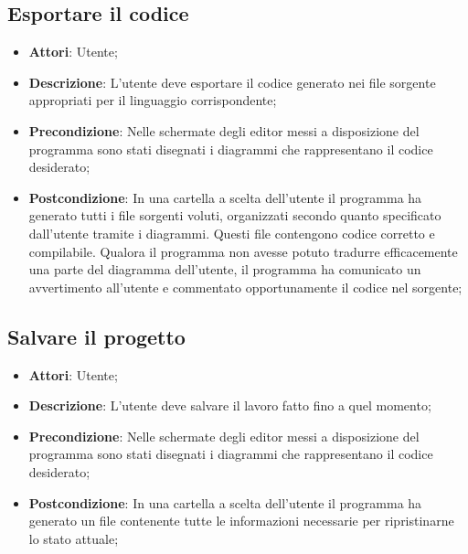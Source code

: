 \documentclass[../AnalisiDeiRequisiti.tex]{subfiles}
\begin{document}
	\subsection{Esportare il codice}
	\begin{itemize}
		\item \textbf{Attori}: Utente;
		\item \textbf{Descrizione}: L'utente deve esportare il codice generato nei file sorgente appropriati per il linguaggio corrispondente;
		\item \textbf{Precondizione}: Nelle schermate degli editor messi a disposizione del programma sono stati disegnati i diagrammi che rappresentano il codice desiderato;
		\item \textbf{Postcondizione}: In una cartella a scelta dell'utente il programma ha generato tutti i file sorgenti voluti, organizzati secondo quanto specificato dall'utente tramite i diagrammi. Questi file contengono codice corretto e compilabile. Qualora il programma non avesse potuto tradurre efficacemente una parte del diagramma dell'utente, il programma ha comunicato un avvertimento all'utente e commentato opportunamente il codice nel sorgente;
	\end{itemize}
	
	\subsection{Salvare il progetto}
	\begin{itemize}
		\item \textbf{Attori}: Utente;
		\item \textbf{Descrizione}: L'utente deve salvare il lavoro fatto fino a quel momento;
		\item \textbf{Precondizione}: Nelle schermate degli editor messi a disposizione del programma sono stati disegnati i diagrammi che rappresentano il codice desiderato;
		\item \textbf{Postcondizione}: In una cartella a scelta dell'utente il programma ha generato un file contenente tutte le informazioni necessarie per ripristinarne lo stato attuale;
	\end{itemize}	
	
\end{document}
